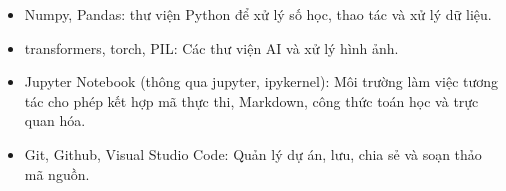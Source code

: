 \begin{itemize}
    \item Numpy, Pandas: thư viện Python để xử lý số học, thao tác và xử lý dữ liệu.
    \item transformers, torch, PIL: Các thư viện AI và xử lý hình ảnh.
    \item Jupyter Notebook (thông qua jupyter, ipykernel): Môi trường làm việc tương tác cho phép kết hợp mã thực thi, Markdown, công thức toán học và trực quan hóa.
    \item Git, Github, Visual Studio Code: Quản lý dự án, lưu, chia sẻ và soạn thảo mã nguồn.
\end{itemize}

\pagebreak